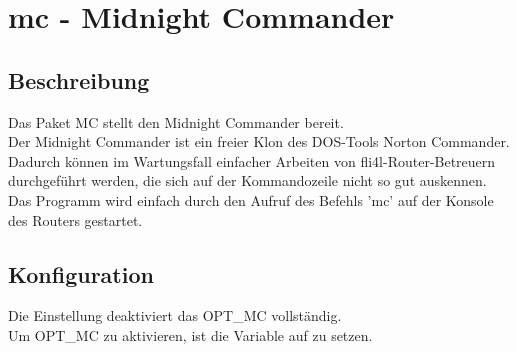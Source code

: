 {
\section {mc - Midnight Commander}
}

\subsection {Beschreibung}
  Das Paket MC stellt den Midnight Commander bereit.\\
  Der Midnight Commander ist ein freier Klon des DOS-Tools Norton Commander.
  Dadurch können im Wartungsfall einfacher Arbeiten von fli4l-Router-Betreuern
  durchgeführt werden, die sich auf der Kommandozeile nicht so gut auskennen.
  Das Programm wird einfach durch den Aufruf des Befehls 'mc' auf der Konsole 
  des Routers gestartet.

\subsection{Konfiguration}

\begin{description}

  Die Einstellung  deaktiviert das OPT\_MC vollständig.\\
  Um OPT\_MC zu aktivieren, ist die Variable  auf 
   zu setzen.

\end{description}
